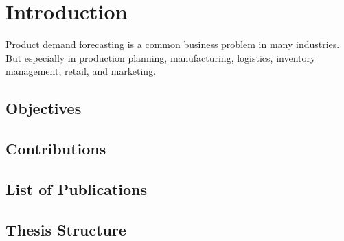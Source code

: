 
\chapter{Introduction}
\label{ch:introduction}


Product demand forecasting is a common business problem in many industries.
But especially in production planning, manufacturing, logistics, inventory management, retail, and marketing.

\section[Objectives]{Objectives}




\section[Contributions]{Contributions}


\section[Publications]{List of Publications}

\section[Thesis Structure]{Thesis Structure}
